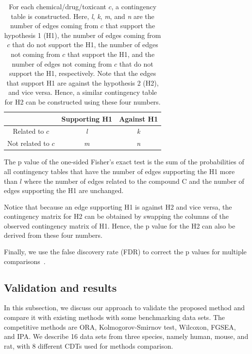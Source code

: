 \documentclass[Minh_PhD_thesis.tex]{subfiles}
\begin{document}
\begin{table}
\caption{For each chemical/drug/toxicant $c$, a contingency table is constructed. Here, \emph{l}, \emph{k}, \emph{m}, and \emph{n} are the number of edges coming from $c$ that support the hypothesis 1 (H1), the number of edges coming from $c$ that do not support the H1, the number of edges not coming from $c$ that support the H1, and the number of edges not coming from $c$ that do not support the H1, respectively. Note that the edges that support H1 are against the hypothesis 2 (H2), and vice versa. Hence, a similar contingency table for H2 can be constructed using these four numbers.}
\begin{center}
\begin{tabular}{c|cc}
&  Supporting H1& Against H1\\
\hline
Related to $c$& \emph{l} & \emph{k} \\
 Not related to $c$&\emph{m}& \emph{n}  \\
\end{tabular}
\end{center}
\label{ConfusionMatrix}
\end{table}%


The p value of the one-sided Fisher's exact test is the sum of the probabilities of all contingency tables that have the number of edges supporting the H1 more than $l$ where the number of edges related to the compound C and the number of edges supporting the H1 are unchanged.

Notice that because an edge supporting H1 is against H2 and vice versa, the contingency matrix for H2 can be obtained by swapping the columns of the observed contingency matrix of H1. Hence, the p value for the H2 can also be derived from these four numbers.


Finally, we use the false discovery rate (FDR) to correct the p values for multiple comparisons~\cite{Benjamini:1997}.




\subsection{Validation and results}

In this subsection, we discuss our approach to validate the proposed method and compare it with existing methods with some benchmarking data sets. The competitive methods are ORA, Kolmogorov-Smirnov test, Wilcoxon, FGSEA, and IPA. We describe 16 data sets from three species, namely human, mouse, and rat, with 8 different CDTs used for methods comparison. %
\end{document}
